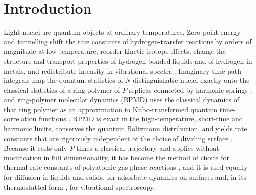 \documentclass[preprint,12pt]{elsarticle}
\begin{document}
\section{Introduction}
\label{sec:introduction}

Light nuclei are quantum objects at ordinary temperatures. Zero-point energy and tunnelling shift the rate constants of hydrogen-transfer reactions by orders of magnitude at low temperature, reorder kinetic isotope effects, change the structure and transport properties of hydrogen-bonded liquids and of hydrogen in metals, and redistribute intensity in vibrational spectra \cite{markland2018}. Imaginary-time path integrals map the quantum statistics of $N$ distinguishable nuclei exactly onto the classical statistics of a ring polymer of $P$ replicas connected by harmonic springs \cite{cw81,pr84}, and ring-polymer molecular dynamics (RPMD) uses the classical dynamics of that ring polymer as an approximation to Kubo-transformed quantum time-correlation functions \cite{rpm04,habershon2013}. RPMD is exact in the high-temperature, short-time and harmonic limits, conserves the quantum Boltzmann distribution, and yields rate constants that are rigorously independent of the choice of dividing surface \cite{rate05,rate05b}. Because it costs only $P$ times a classical trajectory and applies without modification in full dimensionality, it has become the method of choice for thermal rate constants of polyatomic gas-phase reactions \cite{bimol09,suleimanov2016}, and it is used equally for diffusion in liquids and solids, for adsorbate dynamics on surfaces and, in its thermostatted form \cite{trpmd14}, for vibrational spectroscopy.
\end{document}
